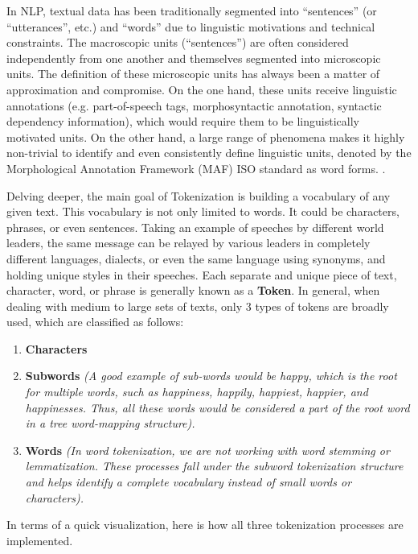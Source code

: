 In NLP, textual data has been traditionally segmented into “sentences” (or “utterances”, etc.) and
“words” due to linguistic motivations and technical constraints. The macroscopic units (“sentences”) are often considered independently from one another and themselves segmented into microscopic units. The definition of these microscopic units has always been a matter of approximation and compromise. On the one hand, these units receive linguistic annotations (e.g. part-of-speech tags, morphosyntactic annotation, syntactic dependency information), which would require them to be linguistically motivated units. On the other hand, a large range of phenomena makes it highly non-trivial to identify and even consistently define linguistic units, denoted by the Morphological Annotation Framework (MAF) ISO standard as word forms. \textcite{DBLP:journals/corr/abs-2112-10508}.

Delving deeper, the main goal of Tokenization is building a vocabulary of any given text. This vocabulary is not only limited to words. It could be characters, phrases, or even sentences. Taking an example of speeches by different world leaders, the same message can be relayed by various leaders in completely different languages, dialects, or even the same language using synonyms, and holding unique styles in their speeches. Each separate and unique piece of text, character, word, or phrase is generally known as a \textbf{Token}. In general, when dealing with medium to large sets of texts, only 3 types of tokens are broadly used, which are classified as follows:

\begin{enumerate}
    \item \textbf{Characters}
    \item \textbf{Subwords} \textit{(A good example of sub-words would be happy, which is the root for multiple words, such as happiness, happily, happiest, happier, and happinesses. Thus, all these words would be considered a part of the root word in a tree word-mapping structure).}
    \item \textbf{Words} \textit{(In word tokenization, we are not working with word stemming or lemmatization. These processes fall under the subword tokenization structure and helps identify a complete vocabulary instead of small words or characters).}
\end{enumerate}

In terms of a quick visualization, here is how all three tokenization processes are implemented.

